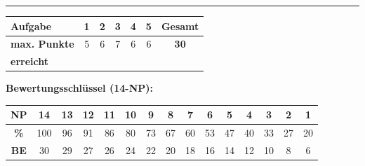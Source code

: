 \documentclass[11pt, a4paper]{article}
\begin{document}

\vspace{15pt}
\hrule
\vspace{10pt}

\noindent
\begin{tabularx}{\textwidth}{|X|c|c|c|c|c||c|}
\hline
\textbf{Aufgabe} & 1 & 2 & 3 & 4 & 5 & \textbf{Gesamt} \\
\hline
\textbf{max. Punkte} & 5 & 6 & 7 & 6 & 6 & \textbf{30} \\
\hline
\textbf{erreicht} & & & & & & \\[0.8em]
\hline
\end{tabularx}

\vspace{15pt}

\noindent\textbf{Bewertungsschlüssel (14-NP):}

\begin{center}
\begin{tabular}{|c|c|c|c|c|c|c|c|c|c|c|c|c|c|c|}
\hline
\textbf{NP} & 14 & 13 & 12 & 11 & 10 & 9 & 8 & 7 & 6 & 5 & 4 & 3 & 2 & 1 \\
\hline
\textbf{\%} & 100 & 96 & 91 & 86 & 80 & 73 & 67 & 60 & 53 & 47 & 40 & 33 & 27 & 20 \\
\hline
\textbf{BE} & 30 & 29 & 27 & 26 & 24 & 22 & 20 & 18 & 16 & 14 & 12 & 10 & 8 & 6 \\
\hline
\end{tabular}
\end{center}
\end{document}

